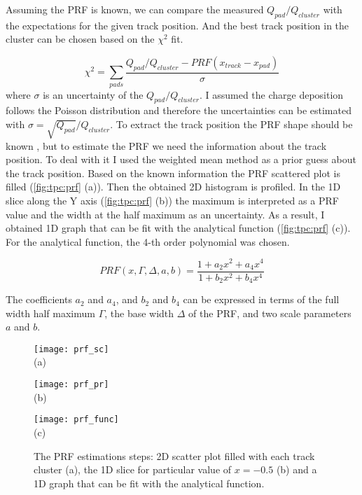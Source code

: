 \documentclass[../main.tex]{subfiles}
\begin{document}
Assuming the PRF is known, we can compare the measured $Q_{pad}/Q_{cluster}$ with the expectations for the given track position. And the best track position in the cluster can be chosen based on the $\chi^2$ fit.

\begin{equation}
\label{eq:tpc:chi2}
\chi^2=\sum_{pads}\frac{Q_{pad}/Q_{cluster} - PRF\left(x_{track} - x_{pad}\right)}{\sigma}
\end{equation}
where $\sigma$ is an uncertainty of the $Q_{pad}/Q_{cluster}$. I assumed the charge deposition follows the Poisson distribution and therefore the uncertainties can be estimated with $\sigma=\sqrt{Q_{pad}}/Q_{cluster}$. To extract the track position the PRF shape should be known , but to estimate the PRF we need the information about the track position. To deal with it I used the weighted mean method as a prior guess about the track position. Based on the known information the PRF scattered plot is filled (\autoref{fig:tpc:prf} (a)). Then the obtained 2D histogram is profiled. In the 1D slice along the Y axis (\autoref{fig:tpc:prf} (b)) the maximum is interpreted as a PRF value and the width at the half maximum as an uncertainty. As a result, I obtained 1D graph that can be fit with the analytical function (\autoref{fig:tpc:prf} (c)). For the analytical function, the 4-th order polynomial was chosen.

\begin{equation}
PRF(x, \Gamma, \Delta, a, b)=\frac{1+a_2x^2+a_4x^4}{1+b_2x^2+b_4x^4}
\label{eq:GL}
\end{equation}

The coefficients $a_2$ and $a_4$, and $b_2$ and $b_4$ can be expressed in terms of the full width half maximum $\Gamma$, the base width $\Delta$ of the PRF, and two scale parameters $a$ and $b$.

\begin{figure}[!ht]
  \centering
  \begin{minipage}{0.33\linewidth}
    \centering
    \texttt{[image: prf\_sc]} \\ (a)
  \end{minipage}
  \begin{minipage}{0.33\linewidth}
    \centering
    \texttt{[image: prf\_pr]} \\ (b)
  \end{minipage}
  \begin{minipage}{0.33\linewidth}
    \centering
    \texttt{[image: prf\_func]} \\ (c)
  \end{minipage}
  \caption{The PRF estimations steps: 2D scatter plot filled with each track cluster (a), the 1D slice for particular value of $x=-0.5$ (b) and a 1D graph that can be fit with the analytical function.}
  \label{fig:tpc:prf}
\end{figure}
\end{document}
